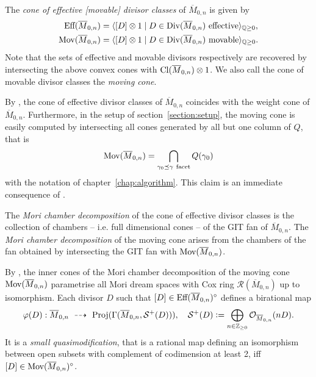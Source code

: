 \begin{defi}
	The \emph{cone of effective [movable] divisor classes} of $\overline{M}_{0,n}$ is given by
	\begin{align*}
		\text{Eff}(\overline{M}_{0,n}) &= \langle [D] \otimes 1 \mid D\in\text{Div}(\overline{M}_{0,n})\ \text{effective} \rangle_{\mathbb{Q}{\geq 0}}, \\
		\text{Mov}(\overline{M}_{0,n}) &= \langle [D] \otimes 1 \mid D\in\text{Div}(\overline{M}_{0,n})\ \text{movable} \rangle_{\mathbb{Q}{\geq 0}}.
	\end{align*}
	Note that the sets of effective and movable divisors respectively are recovered by intersecting the above convex cones with $\text{Cl}(\overline{M}_{0,n}) \otimes 1$. We also call the cone of movable divisor classes the \emph{moving cone}.
\end{defi}

\begin{remark}
	\label{remark:cone_of_divisor_classes_in_mn_context}
	By \cite[Proposition 3.3.2.1]{cox_rings}, the cone of effective divisor classes of $\overline{M}_{0,n}$ coincides with the weight cone of $\overline{M}_{0,n}$. Furthermore, in the setup of section~\ref{section:setup}, the moving cone is easily computed by intersecting all cones generated by all but one column of $Q$, that is
	$$\text{Mov}(\overline{M}_{0,n}) = \bigcap_{\gamma_0 \preceq \gamma\ \mathrm{facet}} Q(\gamma_0)$$
	with the notation of chapter~\ref{chap:algorithm}. This claim is an immediate consequence of \cite[Proposition 3.3.2.3]{cox_rings}.
\end{remark}

\begin{defi}
	The \emph{Mori chamber decomposition} of the cone of effective divisor classes is the collection of chambers -- i.e. full dimensional cones -- of the GIT fan of $\overline{M}_{0,n}$. The \emph{Mori chamber decomposition} of the moving cone arises from the chambers of the fan obtained by intersecting the GIT fan with $\text{Mov}(\overline{M}_{0,n})$.
\end{defi}

By \cite[Remark 3.3.4.2]{cox_rings}, the inner cones of the Mori chamber decomposition of the moving cone  $\text{Mov}(\overline{M}_{0,n})$ parametrise all Mori dream spaces with Cox ring $\mathcal{R}(\overline{M}_{0,n})$ up to isomorphism. Each divisor $D$ such that $[D]\in\text{Eff}(\overline{M}_{0,n})^\circ$ defines a birational map
$$\varphi(D): \overline{M}_{0,n}\ \dashrightarrow\ \text{Proj}(\Gamma(\overline{M}_{0,n}, \mathcal{S}^+(D))), \quad \mathcal{S}^+(D) \defeq \bigoplus_{n\in\integer_{\geq 0}} \O_{\overline{M}_{0,n}}(nD).$$
It is a \emph{small quasimodification}, that is a rational map defining an isomorphism between open subsets with complement of codimension at least 2, iff $[D]\in\text{Mov}(\overline{M}_{0,n})^\circ$.

